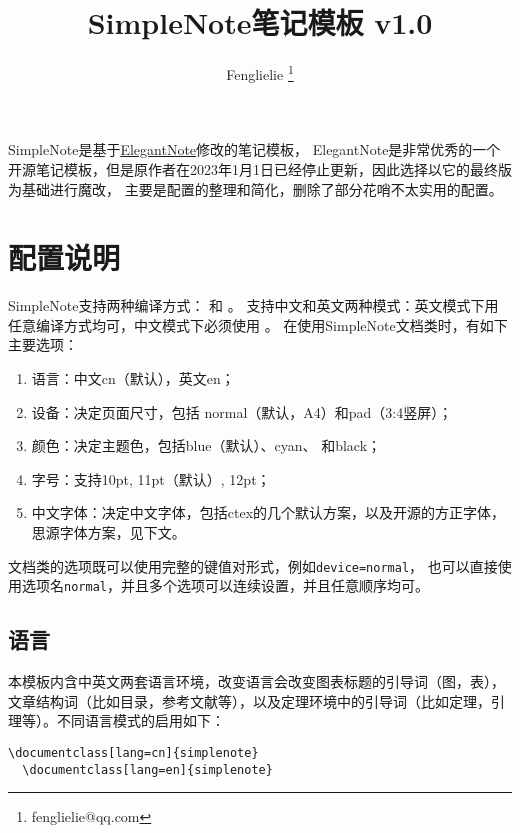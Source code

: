 \documentclass[cnfont=NotoCJK]{../simplenote}
\title{SimpleNote笔记模板 v1.0}
\author{Fenglielie \thanks{fenglielie@qq.com}}
\date{\zhtoday}
\begin{document}
\maketitle

SimpleNote是基于\href{https://github.com/ElegantLaTeX/ElegantNote}{ElegantNote}修改的笔记模板，
ElegantNote是非常优秀的一个开源笔记模板，但是原作者在2023年1月1日已经停止更新，因此选择以它的最终版为基础进行魔改，
主要是配置的整理和简化，删除了部分花哨不太实用的配置。


\section{配置说明}

SimpleNote支持两种编译方式： 和 。
支持中文和英文两种模式：英文模式下用任意编译方式均可，中文模式下必须使用 。
在使用SimpleNote文档类时，有如下主要选项：

\begin{enumerate}
    \item 语言：中文cn（默认），英文en；
    \item 设备：决定页面尺寸，包括 normal（默认，A4）和pad（3:4竖屏）；
    \item 颜色：决定主题色，包括\textcolor{eblue}{blue}（默认）、\textcolor{ecyan}{cyan}、 和\textcolor{eblack}{black}；
    \item 字号：支持10pt, 11pt（默认）, 12pt；
    \item 中文字体：决定中文字体，包括ctex的几个默认方案，以及开源的方正字体，思源字体方案，见下文。
\end{enumerate}



\begin{remark}
    文档类的选项既可以使用完整的键值对形式，例如\lstinline{device=normal}，
    也可以直接使用选项名\lstinline{normal}，并且多个选项可以连续设置，并且任意顺序均可。
\end{remark}

\subsection{语言}

本模板内含中英文两套语言环境，改变语言会改变图表标题的引导词（图，表），文章结构词（比如目录，参考文献等），以及定理环境中的引导词（比如定理，引理等）。不同语言模式的启用如下：
\begin{lstlisting}[frame=single]
  \documentclass[lang=cn]{simplenote}
  \documentclass[lang=en]{simplenote}
\end{lstlisting}
\end{document}

